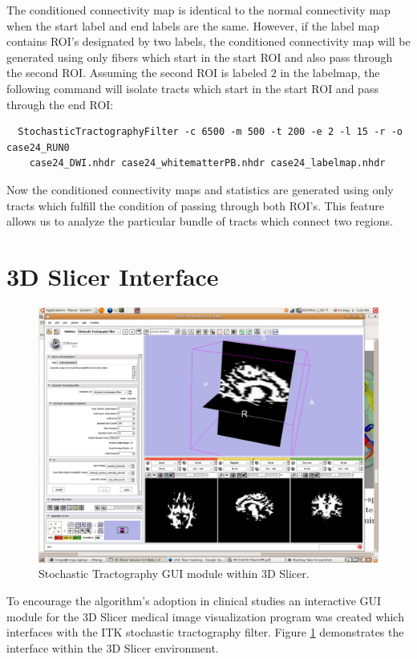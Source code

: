 The conditioned connectivity map is identical to the normal connectivity map when the start label and end labels are the same.  However, if the label map contains ROI's designated by two labels, the conditioned connectivity map will be generated using only fibers which start in the start ROI and also pass through the second ROI.  Assuming the second ROI is labeled $2$ in the labelmap, the following command will isolate tracts which start in the start ROI and pass through the end ROI:
\begin{verbatim}
  StochasticTractographyFilter -c 6500 -m 500 -t 200 -e 2 -l 15 -r -o case24_RUN0
    case24_DWI.nhdr case24_whitematterPB.nhdr case24_labelmap.nhdr
\end{verbatim}

Now the conditioned connectivity maps and statistics are generated using only tracts which fulfill the condition of passing through both ROI's.  This feature allows us to analyze the particular bundle of tracts which connect two regions.
 
\section{3D Slicer Interface}
\begin{figure} \label{fig:slicermodule}
  \center
	\includegraphics[width=0.5\linewidth]{slicermodule}
	\caption{Stochastic Tractography GUI module within 3D Slicer.}
\end{figure}
To encourage the algorithm's adoption in clinical studies an interactive GUI module for the 3D Slicer medical image visualization program was created which interfaces with the ITK stochastic tractography filter.  Figure \ref{fig:slicermodule} demonstrates the interface within the 3D Slicer environment.


